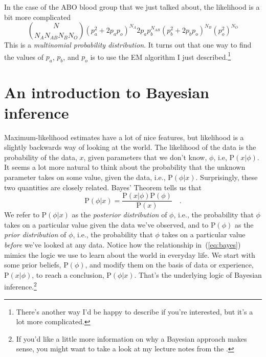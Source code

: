 \documentclass[12pt]{article}
\begin{document}
In the case of the ABO blood group that we just talked about, the
likelihood is a bit more complicated
\begin{equation}
{N \choose N_A N_{AB} N_B N_O} 
\left(p_a^2 + 2p_ap_o\right)^{N_A} 
2p_ap_b^{N_{AB}} 
\left(p_b^2 + 2p_bp_o\right)^{N_B} 
\left(p_o^2\right)^{N_O}
\end{equation}
This is a {\it multinomial probability
distribution}. It turns out that one way to find the values of $p_a$,
$p_b$, and $p_o$ is to use the EM algorithm I just
described.\footnote{There's another way I'd be happy to describe if
  you're interested, but it's a lot more complicated.} 

\section*{An introduction to Bayesian inference} 

Maximum-likelihood estimates have a lot of nice features, but
likelihood is a slightly backwards way of looking at the world. The
likelihood of the data is the probability of the data, $x$, given
parameters that we don't know, $\phi$, i.e, $\mbox{P}(x|\phi)$. It
seems a lot more natural to think about the probability that the
unknown parameter takes on some value, given the data, i.e.,
$\mbox{P}(\phi|x)$. Surprisingly, these two quantities are closely
related. Bayes' Theorem tells us that
\begin{equation}
\mbox{P}(\phi|x) = \frac{\mbox{P}(x|\phi)\mbox{P}(\phi)}{\mbox{P}(x)} \quad .
\label{eq:bayes}
\end{equation}
We refer to $\mbox{P}(\phi|x)$ as the {\it posterior distribution} of
$\phi$, i.e., the probability that $\phi$ takes on a particular value
given the data we've observed, and to $\mbox{P}(\phi)$ as the {\it
  prior distribution} of $\phi$, i.e., the probability that $\phi$
takes on a particular value {\it before\/} we've looked at any
data. Notice how the relationship in~(\ref{eq:bayes}) mimics the logic
we use to learn about the world in everyday life. We start with some
prior beliefs, $\mbox{P}(\phi)$, and modify them on the basis of data
or experience, $\mbox{P}(x|\phi)$, to reach a conclusion,
$\mbox{P}(\phi|x)$. That's the underlying logic of Bayesian
inference.\footnote{If you'd like a little more information on why a
  Bayesian approach makes sense, you might want to take a look at my
  lecture notes from the .}
\end{document}
